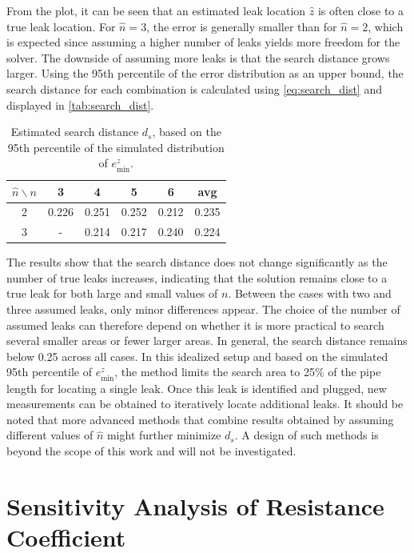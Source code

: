 From the plot, it can be seen that an estimated leak location $\hat{z}$ is often close to a true leak location. For $\hat{n} = 3$, the error is generally smaller than for $\hat{n} = 2$, which is expected since assuming a higher number of leaks yields more freedom for the solver. The downside of assuming more leaks is that the search distance grows larger. Using the 95th percentile of the error distribution as an upper bound, the search distance for each combination is calculated using \cref{eq:search_dist} and displayed in \autoref{tab:search_dist}.\\

\begin{table}[h]
\centering
\begin{tabular}{c|cccc|c}
\hline
\textbf{$\hat{n}\backslash n$} & 3 & 4 & 5 & 6 & avg \\
\hline
2 & 0.226 & 0.251 & 0.252 & 0.212 & 0.235 \\
3 & -    & 0.214 & 0.217 & 0.240 & 0.224 \\
\hline
\end{tabular}
\caption{Estimated search distance $d_s$, based on the 95th percentile of the simulated distribution of $e^z_{\min}$.}
\label{tab:search_dist}
\end{table}

The results show that the search distance does not change significantly as the number of true leaks increases, indicating that the solution remains close to a true leak for both large and small values of $n$. Between the cases with two and three assumed leaks, only minor differences appear. The choice of the number of assumed leaks can therefore depend on whether it is more practical to search several smaller areas or fewer larger areas. In general, the search distance remains below 0.25 across all cases. In this idealized setup and based on the simulated 95th percentile of $e^z_{\min}$, the method limits the search area to 25\% of the pipe length for locating a single leak. Once this leak is identified and plugged, new measurements can be obtained to iteratively locate additional leaks. It should be noted that more advanced methods that combine results obtained by assuming different values of $\hat n$ might further minimize $d_s$. A design of such methods is beyond the scope of this work and will not be investigated.

\section{Sensitivity Analysis of Resistance Coefficient}
\label{sec:mod_err}

